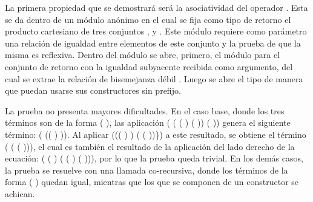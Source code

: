 \begin{AgdaAlign}

La primera propiedad que se demostrará será la asociatividad del operador . Esta se da dentro de un módulo anónimo en el cual se fija como tipo de retorno el producto cartesiano de tres conjuntos ,  y . Este módulo requiere como parámetro una relación de igualdad entre elementos de este conjunto y la prueba de que la misma es reflexiva. Dentro del módulo se abre, primero, el módulo  para el conjunto de retorno  \AgdaDatatype{$\times$}  \AgdaDatatype{$\times$}  con la igualdad subyacente recibida como argumento, del cual se extrae la relación de bisemejanza débil \AgdaFunction{$\_\approx\_$}. Luego se abre el tipo  de manera que puedan usarse sus constructores sin prefijo. 


La prueba no presenta mayores dificultades. En el caso base, donde los tres términos son de la forma ( ), las aplicación ( ( ( ) ( )) ( )) genera el siguiente término: ( (( \AgdaInductiveConstructor{,} ) \AgdaInductiveConstructor{,} )). Al aplicar  (\AgdaSymbol{$\lambda \{$}(( \AgdaInductiveConstructor{,} ) \AgdaInductiveConstructor{,} )\AgdaSymbol{$\rightarrow$} ( \AgdaInductiveConstructor{,} ( \AgdaInductiveConstructor{,} ))\}) a este resultado, se obtiene el término ( ( \AgdaInductiveConstructor{,} ( \AgdaInductiveConstructor{,} ))), el cual es también el resultado de la aplicación del lado derecho de la ecuación: ( ( ) ( ( ) ( ))), por lo que la prueba queda trivial. En los demás casos, la prueba se resuelve con una llamada co-recursiva, donde los términos de la forma ( ) quedan igual, mientras que los que se componen de un constructor  se achican.


\end{AgdaAlign}
